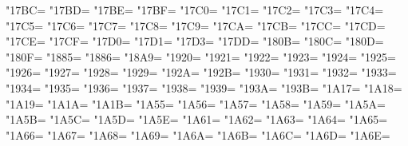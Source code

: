 \XeTeXcharclass"17BC=\KclassCM
\XeTeXcharclass"17BD=\KclassCM
\XeTeXcharclass"17BE=\KclassCM
\XeTeXcharclass"17BF=\KclassCM
\XeTeXcharclass"17C0=\KclassCM
\XeTeXcharclass"17C1=\KclassCM
\XeTeXcharclass"17C2=\KclassCM
\XeTeXcharclass"17C3=\KclassCM
\XeTeXcharclass"17C4=\KclassCM
\XeTeXcharclass"17C5=\KclassCM
\XeTeXcharclass"17C6=\KclassCM
\XeTeXcharclass"17C7=\KclassCM
\XeTeXcharclass"17C8=\KclassCM
\XeTeXcharclass"17C9=\KclassCM
\XeTeXcharclass"17CA=\KclassCM
\XeTeXcharclass"17CB=\KclassCM
\XeTeXcharclass"17CC=\KclassCM
\XeTeXcharclass"17CD=\KclassCM
\XeTeXcharclass"17CE=\KclassCM
\XeTeXcharclass"17CF=\KclassCM
\XeTeXcharclass"17D0=\KclassCM
\XeTeXcharclass"17D1=\KclassCM
\XeTeXcharclass"17D3=\KclassCM
\XeTeXcharclass"17DD=\KclassCM
\XeTeXcharclass"180B=\KclassCM
\XeTeXcharclass"180C=\KclassCM
\XeTeXcharclass"180D=\KclassCM
\XeTeXcharclass"180F=\KclassCM
\XeTeXcharclass"1885=\KclassCM
\XeTeXcharclass"1886=\KclassCM
\XeTeXcharclass"18A9=\KclassCM
\XeTeXcharclass"1920=\KclassCM
\XeTeXcharclass"1921=\KclassCM
\XeTeXcharclass"1922=\KclassCM
\XeTeXcharclass"1923=\KclassCM
\XeTeXcharclass"1924=\KclassCM
\XeTeXcharclass"1925=\KclassCM
\XeTeXcharclass"1926=\KclassCM
\XeTeXcharclass"1927=\KclassCM
\XeTeXcharclass"1928=\KclassCM
\XeTeXcharclass"1929=\KclassCM
\XeTeXcharclass"192A=\KclassCM
\XeTeXcharclass"192B=\KclassCM
\XeTeXcharclass"1930=\KclassCM
\XeTeXcharclass"1931=\KclassCM
\XeTeXcharclass"1932=\KclassCM
\XeTeXcharclass"1933=\KclassCM
\XeTeXcharclass"1934=\KclassCM
\XeTeXcharclass"1935=\KclassCM
\XeTeXcharclass"1936=\KclassCM
\XeTeXcharclass"1937=\KclassCM
\XeTeXcharclass"1938=\KclassCM
\XeTeXcharclass"1939=\KclassCM
\XeTeXcharclass"193A=\KclassCM
\XeTeXcharclass"193B=\KclassCM
\XeTeXcharclass"1A17=\KclassCM
\XeTeXcharclass"1A18=\KclassCM
\XeTeXcharclass"1A19=\KclassCM
\XeTeXcharclass"1A1A=\KclassCM
\XeTeXcharclass"1A1B=\KclassCM
\XeTeXcharclass"1A55=\KclassCM
\XeTeXcharclass"1A56=\KclassCM
\XeTeXcharclass"1A57=\KclassCM
\XeTeXcharclass"1A58=\KclassCM
\XeTeXcharclass"1A59=\KclassCM
\XeTeXcharclass"1A5A=\KclassCM
\XeTeXcharclass"1A5B=\KclassCM
\XeTeXcharclass"1A5C=\KclassCM
\XeTeXcharclass"1A5D=\KclassCM
\XeTeXcharclass"1A5E=\KclassCM
\XeTeXcharclass"1A61=\KclassCM
\XeTeXcharclass"1A62=\KclassCM
\XeTeXcharclass"1A63=\KclassCM
\XeTeXcharclass"1A64=\KclassCM
\XeTeXcharclass"1A65=\KclassCM
\XeTeXcharclass"1A66=\KclassCM
\XeTeXcharclass"1A67=\KclassCM
\XeTeXcharclass"1A68=\KclassCM
\XeTeXcharclass"1A69=\KclassCM
\XeTeXcharclass"1A6A=\KclassCM
\XeTeXcharclass"1A6B=\KclassCM
\XeTeXcharclass"1A6C=\KclassCM
\XeTeXcharclass"1A6D=\KclassCM
\XeTeXcharclass"1A6E=\KclassCM
